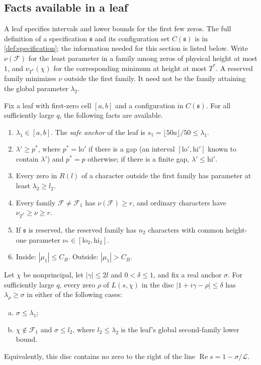 \documentclass[11pt]{amsart}
\numberwithin{equation}{section}
\theoremstyle{plain}
\theoremstyle{definition}
\theoremstyle{remark}
\newcommand{\LL}{\mathcal{L}}
\renewcommand{\Re}{\operatorname{Re}}
\newcommand{\lo}{\mathrm{lo}}
\newcommand{\hi}{\mathrm{hi}}
\newcommand{\1}{\mathbf{1}}
\begin{document}
\subsection{Facts available in a leaf}\label{subsec:leaffacts}
A leaf specifies intervals and lower bounds for the first few zeros. The full definition
of a specification $\mathfrak s$ and its configuration set $C(\mathfrak s)$ is in
\cref{def:specification}; the information needed for this section is listed below.
Write $\nu(\mathcal F)$ for the least parameter in a family among zeros of physical
height at most $1$, and $\nu_{T^*}(\chi)$ for the corresponding minimum at height at
most $T^*$. A reserved family minimizes $\nu$ outside the first family. It need not
be the family attaining the global parameter $\lambda_2$.

Fix a leaf with first-zero cell $[a,b]$ and a configuration in $C(\mathfrak s)$.
For all sufficiently large $q$, the following facts are available.
\begin{enumerate}[(Z1)]
  \item $\lambda_1\in[a,b]$. The \emph{safe anchor} of the leaf is $s_1=\lfloor50a\rfloor/50\le\lambda_1$.
  \item $\lambda'\ge p^*$, where $p^*=\lo'$ if there is a gap (an interval $[\lo',\hi']$ known to
    contain $\lambda'$) and $p^*=p$ otherwise; if there is a finite gap, $\lambda'\le\hi'$.
  \item Every zero in $R(l)$ of a character outside the first family has parameter at least
    $\lambda_2\ge l_2$.
  \item Every family $\mathcal F\ne \mathcal F_1$ has $\nu(\mathcal F)\ge r$, and ordinary characters have $\nu_{T^*}\ge\nu\ge r$.
  \item If $\mathfrak s$ is reserved, the reserved family has $n_2$ characters with common height-one
    parameter $\nu_*\in[\lo_2,\hi_2]$.
  \item Inside: $|\mu_1|\le C_B$. Outside: $|\mu_1|>C_B$.
\end{enumerate}

\begin{lemma}\label{lem:noright}
Let $\chi$ be nonprincipal, let $|\gamma|\le2l$ and $0<\delta\le1$, and fix a real anchor
$\sigma$. For sufficiently large $q$, every zero $\rho$ of $L(s,\chi)$ in the disc
$|1+i\gamma-\rho|\le\delta$ has $\lambda_\rho\ge\sigma$ in either of the following cases:
\begin{enumerate}[(a)]
  \item $\sigma\le\lambda_1$;
  \item $\chi\notin\mathcal F_1$ and $\sigma\le l_2$, where $l_2\le\lambda_2$ is the leaf's
    global second-family lower bound.
\end{enumerate}
Equivalently, this disc contains no zero to the right of the line
$\Re s=1-\sigma/\LL$.
\end{lemma}
\end{document}
